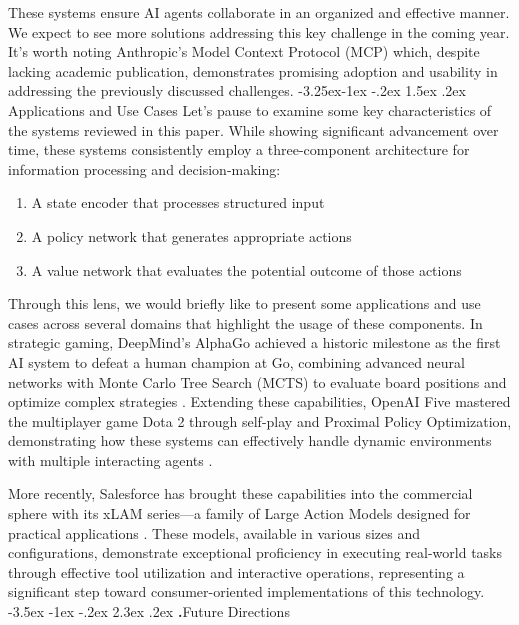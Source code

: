 \documentclass[journal,twoside,10pt]{IEEEtran}
\makeatletter
\renewcommand\section{\@startsection{section}{1}{\z@}%
                       {-3.5ex \@plus -1ex \@minus -.2ex}%
                       {2.3ex \@plus.2ex}%
                       {\normalfont\Large\bfseries\Roman{section}.\quad}}
\renewcommand\subsection{\@startsection{subsection}{2}{\z@}%
                       {-3.25ex\@plus -1ex \@minus -.2ex}%
                       {1.5ex \@plus .2ex}%
                       {\normalfont\large\bfseries}}
\makeatother
\begin{document}
These systems ensure AI agents collaborate in an organized and effective manner. We expect to see more solutions addressing this key challenge in the coming year. It's worth noting Anthropic's Model Context Protocol (MCP) which, despite lacking academic publication, demonstrates promising adoption and usability in addressing the previously discussed challenges.
\subsection{Applications and Use Cases}
Let's pause to examine some key characteristics of the systems reviewed in this paper. While showing significant advancement over time, these systems consistently employ a three-component architecture for information processing and decision-making:

\begin{enumerate}
    \item A state encoder that processes structured input
    \item A policy network that generates appropriate actions
    \item A value network that evaluates the potential outcome of those actions
\end{enumerate}

Through this lens, we would briefly like to present some applications and use cases across several domains that highlight the usage of these components.
In strategic gaming, DeepMind's AlphaGo achieved a historic milestone as the first AI system to defeat a human champion at Go, combining advanced neural networks with Monte Carlo Tree Search (MCTS) to evaluate board positions and optimize complex strategies \cite{silver2016mastering}. Extending these capabilities, OpenAI Five mastered the multiplayer game Dota 2 through self-play and Proximal Policy Optimization, demonstrating how these systems can effectively handle dynamic environments with multiple interacting agents \cite{openai2019dota}.

More recently, Salesforce has brought these capabilities into the commercial sphere with its xLAM series—a family of Large Action Models designed for practical applications \cite{zhang2024xlam}. These models, available in various sizes and configurations, demonstrate exceptional proficiency in executing real-world tasks through effective tool utilization and interactive operations, representing a significant step toward consumer-oriented implementations of this technology.
\section{Future Directions} 
\end{document}
